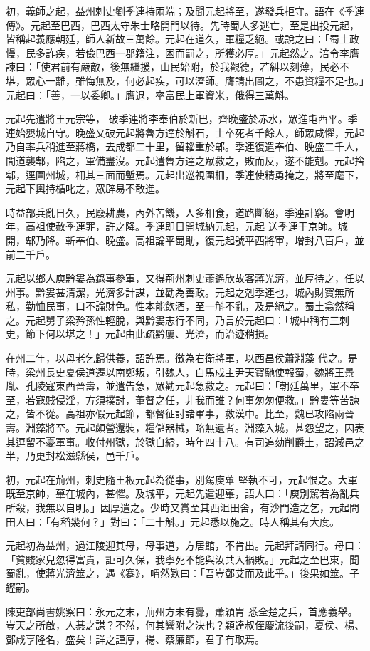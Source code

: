 \begin{pinyinscope}
 初，義師之起，益州刺史劉季連持兩端；及聞元起將至，遂發兵拒守。語在《季連傳》。元起至巴西，巴西太守朱士略開門以待。先時蜀人多逃亡，至是出投元起，皆稱起義應朝廷，師人新故三萬餘。元起在道久，軍糧乏絕。或說之曰：「蜀土政慢，民多詐疾，若儉巴西一郡籍注，困而罰之，所獲必厚。」元起然之。涪令李膺諫曰：「使君前有嚴敵，後無繼援，山民始附，於我觀德，若糾以刻薄，民必不堪，眾心一離，雖悔無及，何必起疾，可以濟師。膺請出圖之，不患資糧不足也。」元起曰：「善，一以委卿。」膺退，率富民上軍資米，俄得三萬斛。



 元起先遣將王元宗等，
 破季連將李奉伯於新巴，齊晚盛於赤水，眾進屯西平。季連始嬰城自守。晚盛又破元起將魯方達於斛石，士卒死者千餘人，師眾咸懼，元起乃自率兵稍進至蔣橋，去成都二十里，留輜重於郫。季連復遣奉伯、晚盛二千人，間道襲郫，陷之，軍備盡沒。元起遣魯方達之眾救之，敗而反，遂不能剋。元起捨郫，逕圍州城，柵其三面而塹焉。元起出巡視圍柵，季連使精勇掩之，將至麾下，元起下輿持楯叱之，眾辟易不敢進。



 時益部兵亂日久，民廢耕農，內外苦饑，人多相食，道路斷絕，季連計窮。會明年，高祖使赦季連罪，許之降。季連即日開城納元起，元起
 送季連于京師。城開，郫乃降。斬奉伯、晚盛。高祖論平蜀勛，復元起號平西將軍，增封八百戶，並前二千戶。



 元起以鄉人庾黔婁為錄事參軍，又得荊州刺史蕭遙欣故客蔣光濟，並厚待之，任以州事。黔婁甚清潔，光濟多計謀，並勸為善政。元起之剋季連也，城內財寶無所私，勤恤民事，口不論財色。性本能飲酒，至一斛不亂，及是絕之。蜀土翕然稱之。元起舅子梁矜孫性輕脫，與黔婁志行不同，乃言於元起曰：「城中稱有三刺史，節下何以堪之！」元起由此疏黔屢、光濟，而治迹稍損。



 在州二年，以母老乞歸供養，詔許焉。徵為右衛將軍，以西昌侯蕭淵藻
 代之。是時，梁州長史夏侯道遷以南鄭叛，引魏人，白馬戍主尹天寶馳使報蜀，魏將王景胤、孔陵寇東西晉壽，並遣告急，眾勸元起急救之。元起曰：「朝廷萬里，軍不卒至，若寇賊侵淫，方須撲討，董督之任，非我而誰？何事匆匆便救。」黔婁等苦諫之，皆不從。高祖亦假元起節，都督征討諸軍事，救漢中。比至，魏已攻陷兩晉壽。淵藻將至。元起頗營還裝，糧儲器械，略無遺者。淵藻入城，甚怨望之，因表其逗留不憂軍事。收付州獄，於獄自縊，時年四十八。有司追劾削爵土，詔減邑之半，乃更封松滋縣侯，邑千戶。



 初，元起在荊州，刺史隨王板元起為從事，別駕庾蓽
 堅執不可，元起恨之。大軍既至京師，蓽在城內，甚懼。及城平，元起先遣迎蓽，語人曰：「庾別駕若為亂兵所殺，我無以自明。」因厚遣之。少時又賞至其西沮田舍，有沙門造之乞，元起問田人曰：「有稻幾何？」對曰：「二十斛。」元起悉以施之。時人稱其有大度。



 元起初為益州，過江陵迎其母，母事道，方居館，不肯出。元起拜請同行。母曰：「貧賤家兒忽得富貴，詎可久保，我寧死不能與汝共入禍敗。」元起之至巴東，聞蜀亂，使蔣光濟筮之，遇《蹇》，喟然歎曰：「吾豈鄧艾而及此乎。」後果如筮。子鏗嗣。



 陳吏部尚書姚察曰：永元之末，荊州方未有釁，蕭穎胄
 悉全楚之兵，首應義舉。豈天之所啟，人惎之謀？不然，何其響附之決也？穎達叔侄慶流後嗣，夏侯、楊、鄧咸享隆名，盛矣！詳之謹厚，楊、蔡廉節，君子有取焉。



\end{pinyinscope}